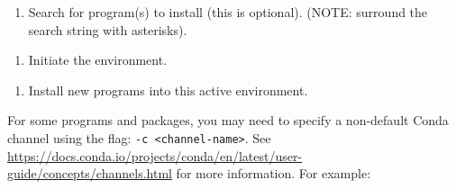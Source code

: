 \documentclass[
]{book}
\newenvironment{Shaded}{\begin{snugshade}}{\end{snugshade}}
\newcommand{\NormalTok}[1]{#1}
\newcommand{\OperatorTok}[1]{\textcolor[rgb]{0.81,0.36,0.00}{\textbf{#1}}}
\newcommand{\StringTok}[1]{\textcolor[rgb]{0.31,0.60,0.02}{#1}}
\providecommand{\tightlist}{%
  \setlength{\itemsep}{0pt}\setlength{\parskip}{0pt}}
\begin{document}
\begin{enumerate}
\def\labelenumi{\arabic{enumi}.}
\setcounter{enumi}{7}
\tightlist
\item
  Search for program(s) to install (this is optional). (NOTE: surround the search string with asterisks).
\end{enumerate}

\begin{Shaded}
\end{Shaded}

\begin{enumerate}
\def\labelenumi{\arabic{enumi}.}
\setcounter{enumi}{8}
\tightlist
\item
  Initiate the environment.
\end{enumerate}

\begin{Shaded}
\end{Shaded}

\begin{enumerate}
\def\labelenumi{\arabic{enumi}.}
\setcounter{enumi}{9}
\tightlist
\item
  Install new programs into this active environment.
\end{enumerate}

\begin{Shaded}
\end{Shaded}

For some programs and packages, you may need to specify a non-default Conda channel using the flag: \texttt{-c\ \textless{}channel-name\textgreater{}}. See \url{https://docs.conda.io/projects/conda/en/latest/user-guide/concepts/channels.html} for more information. For example:
\end{document}
